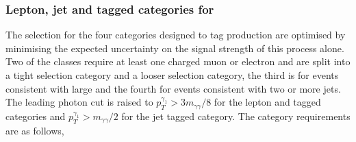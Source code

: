 \subsubsection{Lepton, jet and \MET tagged categories for \VH}
\label{sec:vh_tag}

The selection for the four categories designed to tag \VH production are optimised by minimising the expected uncertainty on the signal strength of this process alone. Two of the classes require at least one charged muon or electron and are split into a tight selection category and a looser selection category, the third is for events consistent with large \MET and the fourth for events consistent with two or more jets. The leading photon cut is raised to $p_{T}^{\gamma_{1}}>3m_{\gamma\gamma}/8$ for the lepton and \MET tagged categories and $p_{T}^{\gamma_{1}}>m_{\gamma\gamma}/2$ for the jet tagged category. The category requirements are as follows,

